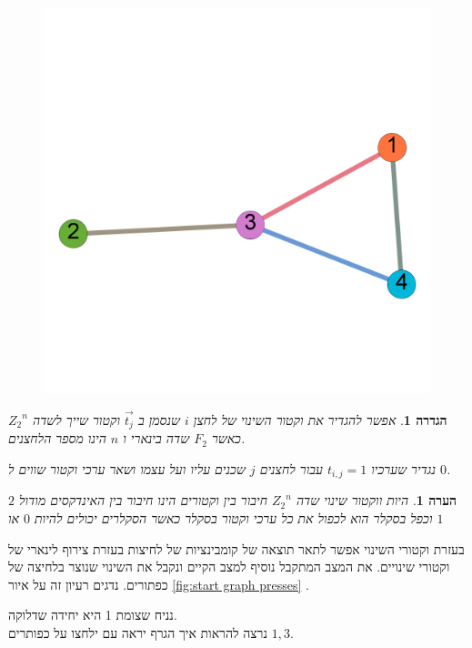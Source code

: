 \documentclass[12pt,twoside]{article}
\newtheorem{definition}{הגדרה}[section]
\newtheorem{comm}{הערה}[section]
\newcommand{\Zn}{{Z_2}^n}
\begin{document}
\begin{figure}[ht]
    \caption{}
    \label{fig:numbering_graph}
    \unsethebrew
    \centering
    \includegraphics[width=.7\textwidth,height=.7\textheight,keepaspectratio]{images/numbering_graph.PNG}
\end{figure}
\sethebrew

\begin{definition}
    אפשר להגדיר את 
    וקטור השינוי
    של 
    לחצן
    $i$
    שנסמן ב
    $\vec{t_j}$
    וקטור
    שייך 
    לשדה 
    $\Zn$
    כאשר 
    $F_2$
    שדה בינארי
    ו 
    $n$
    הינו מספר הלחצנים.

    נגדיר שערכיו
    $t_{i,j} = 1$
    עבור
    לחצנים
    $j$
    שכנים עליו ועל עצמו
    ושאר ערכי וקטור שווים ל
    $0$.
\end{definition}

\begin{comm}
    היות ווקטור שינוי שדה
    $\Zn$
    חיבור בין וקטורים הינו חיבור בין האינדקסים מודול 
    $2$
    וכפל בסקלר
    הוא לכפול את כל ערכי וקטור בסקלר
    כאשר הסקלרים יכולים להיות
    $0$
    או 
    $1$
\end{comm}

בעזרת וקטורי השינוי אפשר לתאר תוצאה של קומבינציות של לחיצות
בעזרת צירוף לינארי של וקטורי שינויים.
את המצב המתקבל נוסיף למצב הקיים ונקבל את השינוי שנוצר בלחיצה של כפתורים.
נדגים רעיון זה על איור
\ref{fig:start graph presses}
.

נניח שצומת 1 היא יחידה שדלוקה.
\\
נרצה להראות איך הגרף יראה עם ילחצו על כפותרים 
$1, 3$.
\end{document}
